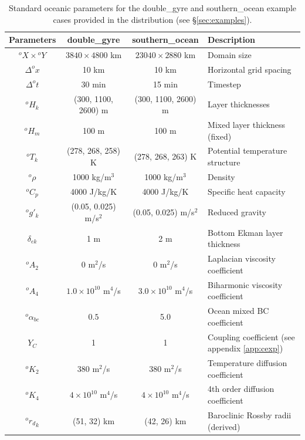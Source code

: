 \documentclass[11pt, a4paper,twoside]{article}
\newcommand{\rhb}[1]{{{}^{#1}\rho}}
\newcommand{\gp}[2]{{}^{#1}g'_{#2}}
\newcommand{\cp}[1]{{{}^{#1}C_p}}
\newcommand{\HH}[2]{{{}^{#1}H_{#2}}}
\newcommand{\at}[1]{{{}^{#1}A_2}}
\newcommand{\ah}[1]{{{}^{#1}A_4}}
\newcommand{\kh}[1]{{{}^{#1}K_2}}
\newcommand{\kf}[1]{{{}^{#1}K_4}}
\newcommand{\T}[2]{{{}^{#1}T_{#2}}}
\newcommand{\alphbc}[1]{{}^{#1}\alpha_{bc}}
\newcommand{\delek}[0]{\delta_{ek}}
\numberwithin{equation}{section}
\begin{document}
\begin{table}
  \begin{center}
    \begin{tabular}{cccl}
\hline
Parameters  & \hspace{4mm}double\_gyre\hspace{4mm} &  \hspace{4mm}southern\_ocean\hspace{4mm} & Description\hspace{4mm} \\
\hline
${}^o X \times {}^o Y$ & $3840 \times 4800$ km & $23040 \times 2880$ km &Domain size\\
$\Delta^ox$ & 10 km & 10 km &Horizontal grid spacing\\
$\Delta^ot$ & 30 min & 15 min & Timestep \\
$\HH{o}{k}$& (300, 1100, 2600) m &(300, 1100, 2600) m & Layer thicknesses\\
$\HH{o}{m}$ & 100 m &100 m & Mixed layer thickness (fixed)\\
$\T{o}{k}$ & (278, 268, 258) K &(278, 268, 263) K & Potential temperature structure \\
$\rhb{o}$ & 1000 kg/m${}^3$ &1000 kg/m${}^3$ & Density\\
$\cp{o}$ & 4000 J/kg/K &4000 J/kg/K &  Specific heat capacity\\
$\gp{o}{k}$ & (0.05, 0.025) m/s${}^2$ &(0.05, 0.025) m/s${}^2$ & Reduced gravity\\
$\delek$ & 1 m & 2 m & Bottom Ekman layer thickness\\
$\at{o}$ & 0 m${}^2$/s &0 m${}^2$/s & Laplacian viscosity coefficient\\
$\ah{o}$ & $1.0 \times 10^{10}$ m${}^4$/s &$3.0 \times 10^{10}$ m${}^4$/s & Biharmonic viscosity coefficient\\
$\alphbc{o}$ & $ 0.5$ & 5.0 & Ocean mixed BC coefficient\\
$Y_C$ & 1 & 1 & Coupling coefficient (see appendix \ref{app:cexp})\\
$\kh{o}$ & 380 m${}^2$/s &380 m${}^2$/s &Temperature diffusion coefficient\\
$\kf{o}$ & $4 \times 10^{10}$ m${}^4$/s &$4 \times 10^{10}$ m${}^4$/s & 4th order diffusion coefficient\\
${}^o{r_d}_k$ & (51, 32) km & (42, 26) km &Baroclinic Rossby radii (derived)\\
\hline
    \end{tabular}
  \end{center}
\caption{\small Standard oceanic parameters for the double\_gyre and southern\_ocean example cases provided in the distribution (see \S\ref{sec:examples}).  \label{tab:oce}}
\end{table}
\end{document}
